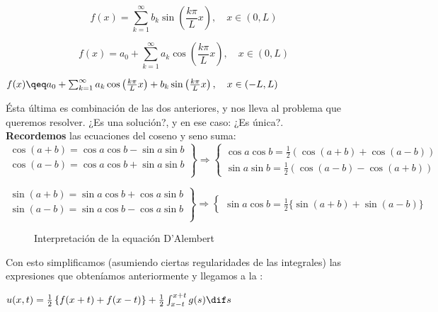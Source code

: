 		\[ f(x) = \sum_{k=1}^{\infty} b_k \sin \left( \frac{k \pi}{L} x \right), \quad x \in (0,L) \]

		\[ f(x) = a_0 + \sum^{\infty}_{k=1} a_k \cos \left( \frac{k \pi}{L} x \right), \quad x \in (0,L) \]

		\(
		f(x) \qeq a_0 + \sum^{\infty}_{k=1} a_k \cos \left( \frac{k \pi}{L} x \right) + b_k \sin \left( \frac{k \pi}{L} x \right), \quad x \in (-L,L)
		\)

		Ésta última es combinación de las dos anteriores, y nos lleva al problema que queremos resolver. ¿Es una solución?, y en ese caso: ¿Es única?.\\

		\textbf{Recordemos} las ecuaciones del coseno y seno suma:
		\[
		\left. \begin{array}{r}
			\cos (a + b) = \cos a \cos b - \sin a \sin b \\
			\cos (a - b) = \cos a \cos b + \sin a \sin b \\
		\end{array} \right\} \Rightarrow \left\{ \begin{array}{l}
			\cos a \cos b = \frac{1}{2} (\cos (a+b) + \cos (a-b)) \\
			\sin a \sin b = \frac{1}{2} (\cos (a-b) - \cos (a+b))
		\end{array} \right.
		\]

		\[
		\left. \begin{array}{r}
			\sin (a + b) = \sin a \cos b + \cos a \sin b \\
			\sin (a - b) = \sin a \cos b - \cos a \sin b \\
		\end{array} \right\} \Rightarrow \left\{ \begin{array}{l}
			\sin a \cos b = \frac{1}{2} \{\sin (a+b) + \sin(a-b)\}
		\end{array} \right.
		\]

		\begin{figure}[thbp]
		\centering
		\caption{Interpretación de la equación D'Alembert}
		\label{fig:interpretacionDalembert}
		\end{figure}

		Con esto simplificamos (asumiendo ciertas regularidades de las integrales) las expresiones que obteníamos anteriormente y llegamos a la :

		\(
		u(x,t) = \frac{1}{2} \left\{ f(x+t) + f(x-t) \right\} + \frac{1}{2} \int^{x+t}_{x-t} g(s) \dif s  \label{eq:DALEMBERT}\)

